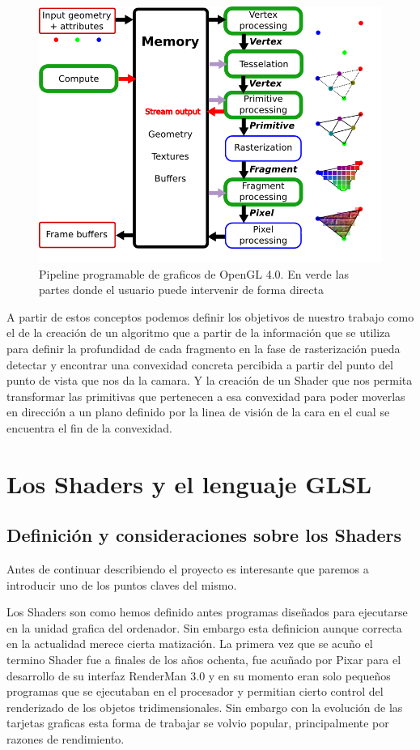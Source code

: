 \begin{figure}
\centering
\includegraphics[width=\textwidth]{imagenes/pipeline-v4.png}
\caption{Pipeline programable de graficos de OpenGL 4.0. En verde las partes donde el usuario puede intervenir de forma directa}
\end{figure}

A partir de estos conceptos podemos definir los objetivos de nuestro trabajo como el de la creación de un algoritmo que a partir de la información que se utiliza para definir la profundidad de cada fragmento en la fase de rasterización pueda detectar y encontrar una convexidad concreta
percibida a partir del punto del punto de vista que nos da la camara. Y la creación de un Shader que nos permita transformar las primitivas que pertenecen a esa convexidad para poder moverlas en dirección a un plano definido por la linea de visión de la cara en el cual se encuentra el fin de la convexidad.

\section{Los Shaders y el lenguaje GLSL}

\subsection{Definición y consideraciones sobre los Shaders}

Antes de continuar describiendo el proyecto es interesante que paremos a introducir uno de los puntos claves del mismo.

Los Shaders son como hemos definido antes programas diseñados para ejecutarse en la unidad grafica del ordenador. Sin embargo esta definicion aunque correcta en la actualidad merece cierta matización. La primera vez que se acuño el termino Shader fue a finales de los años ochenta, fue acuñado por Pixar para el desarrollo de su interfaz RenderMan 3.0 y en su momento eran solo pequeños programas que se ejecutaban en el procesador
y permitian cierto control del renderizado de los objetos tridimensionales. Sin embargo con la evolución de las tarjetas graficas esta forma de trabajar se volvio popular, principalmente por razones de rendimiento. 

